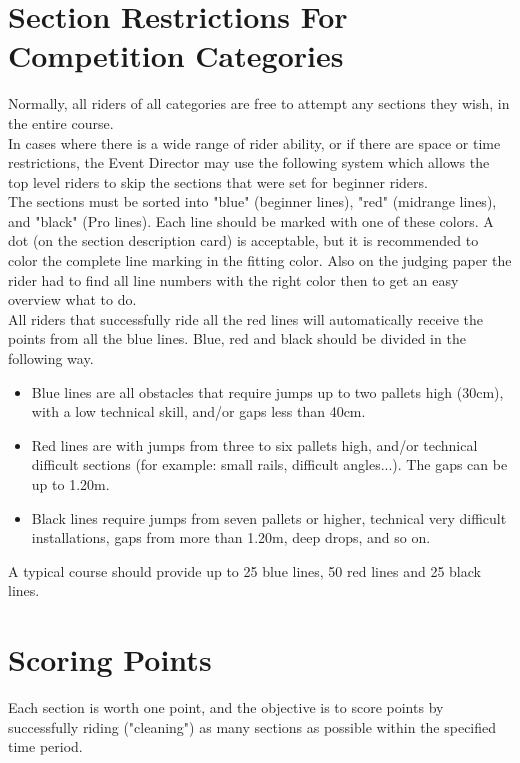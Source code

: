 \section{Section Restrictions For Competition Categories}
Normally, all riders of all categories are free to attempt any sections they wish, in the entire course.\\
In cases where there is a wide range of rider ability, or if there are space or time restrictions, the Event Director may use the following system which allows the top level riders to skip the sections that were set for beginner riders.\\
The sections must be sorted into "blue" (beginner lines), "red" (midrange lines), and "black" (Pro lines). Each line should be marked with one of these colors. A dot (on the section description card) is acceptable, but it is recommended to color the complete line marking in the fitting color. Also on the judging paper the rider had to find all line numbers with the right color then to get an easy overview what to do.\\
All riders that successfully ride all the red lines will automatically receive the points from all the blue lines. Blue, red and black should be divided in the following way.\\
\begin{itemize}
\item Blue lines are all obstacles that require jumps up to two pallets high (30cm), with a low technical skill, and/or gaps less than 40cm.
\item Red lines are with jumps from three to six pallets high, and/or technical difficult sections (for example: small rails, difficult angles...). The gaps can be up to 1.20m.
\item Black lines require jumps from seven pallets or higher, technical very difficult installations, gaps from more than
1.20m, deep drops, and so on. 
\end{itemize}
A typical course should provide up to 25 blue lines, 50 red lines and 25 black lines.


\section{Scoring Points}
Each section is worth one point, and the objective is to score points by successfully riding ("cleaning") as many sections as possible within the specified time period.

